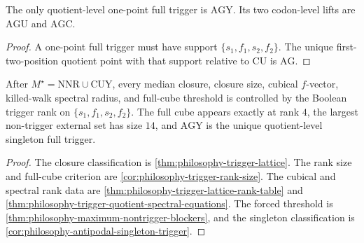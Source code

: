 \begin{corollary}
\label{cor:philosophy-antipodal-singleton-trigger}
The only quotient-level one-point full trigger is $\mathrm{AGY}$. Its
two codon-level lifts are $\mathrm{AGU}$ and $\mathrm{AGC}$.
\end{corollary}
\begin{proof}
A one-point full trigger must have support
$\{s_{1},f_{1},s_{2},f_{2}\}$. The unique first-two-position quotient
point with that support relative to $\mathrm{CU}$ is $\mathrm{AG}$.
\end{proof}

\begin{theorem}
\label{thm:philosophy-rank-spectral-trigger-lattice-theorem}
After $M^{\star}=\mathrm{NNR}\cup\mathrm{CUY}$, every median closure,
closure size, cubical $f$-vector, killed-walk spectral radius, and
full-cube threshold is controlled by the Boolean trigger rank on
$\{s_{1},f_{1},s_{2},f_{2}\}$. The full cube appears exactly at rank
$4$, the largest non-trigger external set has size $14$, and
$\mathrm{AGY}$ is the unique quotient-level singleton full trigger.
\end{theorem}
\begin{proof}
The closure classification is \autoref{thm:philosophy-trigger-lattice}.
The rank size and full-cube criterion are
\autoref{cor:philosophy-trigger-rank-size}. The cubical and spectral
rank data are \autoref{thm:philosophy-trigger-lattice-rank-table} and
\autoref{thm:philosophy-trigger-quotient-spectral-equations}. The
forced threshold is \autoref{thm:philosophy-maximum-nontrigger-blockers},
and the singleton classification is
\autoref{cor:philosophy-antipodal-singleton-trigger}.
\end{proof}
